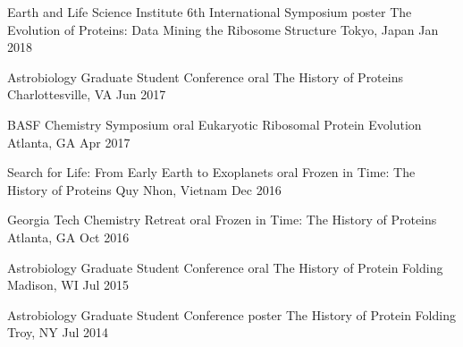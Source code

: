 

\begin{cventries}

  \cventry
    {Earth and Life Science Institute 6th International Symposium {\cdotp} poster} %
    {The Evolution of Proteins: Data Mining the Ribosome Structure} %
    {Tokyo, Japan} %
    {Jan 2018} %
    {}
    \vspace{-5.0mm}

  \cventry
    {Astrobiology Graduate Student Conference {\cdotp} oral} %
    {The History of Proteins} %
    {Charlottesville, VA} %
    {Jun 2017} %
    {}
    \vspace{-5.0mm}

  \cventry
    {BASF Chemistry Symposium {\cdotp} oral} %
    {Eukaryotic Ribosomal Protein Evolution} %
    {Atlanta, GA} %
    {Apr 2017} %
    {}
    \vspace{-5.0mm}

  \cventry
    {Search for Life: From Early Earth to Exoplanets {\cdotp} oral} %
    {Frozen in Time: The History of Proteins} %
    {Quy Nhon, Vietnam} %
    {Dec 2016} %
    {}
    \vspace{-5.0mm}

  \cventry
    {Georgia Tech Chemistry Retreat {\cdotp} oral} %
    {Frozen in Time: The History of Proteins} %
    {Atlanta, GA} %
    {Oct 2016} %
    {}
    \vspace{-5.0mm}

  \cventry
    {Astrobiology Graduate Student Conference {\cdotp} oral} %
    {The History of Protein Folding} %
    {Madison, WI} %
    {Jul 2015} %
    {}
    \vspace{-5.0mm}

  \cventry
    {Astrobiology Graduate Student Conference {\cdotp} poster} %
    {The History of Protein Folding} %
    {Troy, NY} %
    {Jul 2014} %
    {}
    \vspace{-8.0mm}

\end{cventries}
